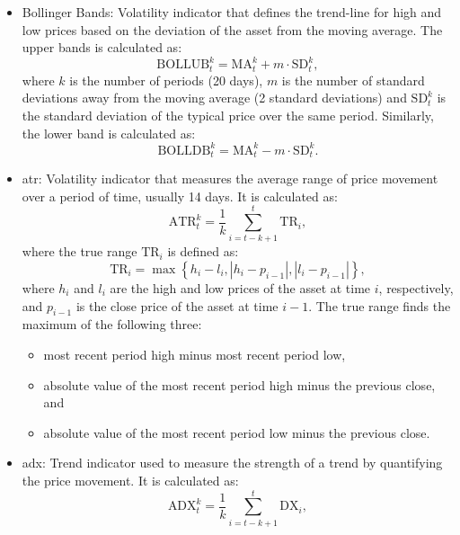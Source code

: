 \begin{itemize}
    \item Bollinger Bands: Volatility indicator that defines the trend-line for high and low prices based on the deviation of the asset from the moving average. The upper bands is calculated as:
    \begin{equation}
        \text{BOLLUB}_t^k = \text{MA}_t^k + m \cdot \text{SD}_t^k,
    \end{equation}
    where $k$ is the number of periods (20 days), $m$ is the number of standard deviations away from the moving average (2 standard deviations) and $\text{SD}_t^k$ is the standard deviation of the typical price over the same period. Similarly, the lower band is calculated as:
    \begin{equation}
        \text{BOLLDB}_t^k = \text{MA}_t^k - m \cdot \text{SD}_t^k.
    \end{equation}
    \item \acrfull{atr}: Volatility indicator that measures the average range of price movement over a period of time, usually 14 days. It is calculated as:
    \begin{equation}
        \text{ATR}_t^k = \frac{1}{k} \sum_{i=t-k+1}^{t} \text{TR}_i,
    \end{equation}
    where the true range $\text{TR}_i$ is defined as:
    \begin{equation}
        \text{TR}_i = \max \left\{ h_i - l_i, \left|h_i - p_{i-1}\right|, \left|l_i - p_{i-1}\right| \right\},
    \end{equation}
    where $h_i$ and $l_i$ are the high and low prices of the asset at time $i$, respectively, and $p_{i-1}$ is the close price of the asset at time $i-1$. The true range finds the maximum of the following three:
    \begin{itemize}
        \item most recent period high minus most recent period low,
        \item absolute value of the most recent period high minus the previous close, and
        \item absolute value of the most recent period low minus the previous close.
    \end{itemize}
    \item \acrfull{adx}: Trend indicator used to measure the strength of a trend by quantifying the price movement. It is calculated as:
    \begin{equation}
        \text{ADX}_t^k = \frac{1}{k} \sum_{i=t-k+1}^{t} \text{DX}_i,
    \end{equation}

\end{itemize}
